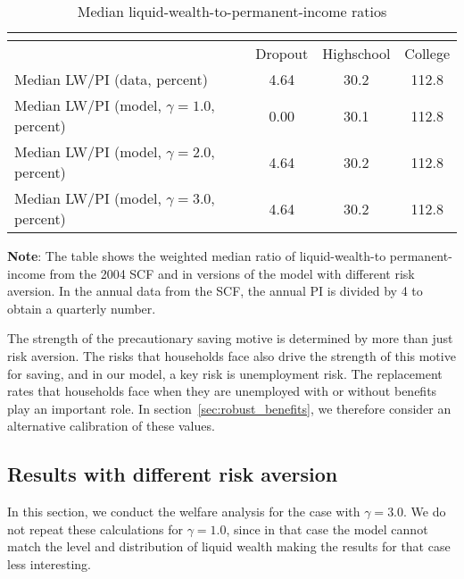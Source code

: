 \documentclass[\PathToRoot/\ProjectName]{subfiles}
\begin{document}
\begin{table}[th]
  \begin{center}
    \begin{tabular}{lccc}
      \multicolumn{4}{l}{}                                                           \\ \midrule
                                                    & Dropout & Highschool & College \\ \midrule
      Median LW/PI (data, percent)                  & 4.64    & 30.2       & 112.8   \\
      Median LW/PI (model, $\gamma = 1.0$, percent) & 0.00    & 30.1       & 112.8   \\
      Median LW/PI (model, $\gamma = 2.0$, percent) & 4.64    & 30.2       & 112.8   \\
      Median LW/PI (model, $\gamma = 3.0$, percent) & 4.64    & 30.2       & 112.8   \\ \bottomrule
    \end{tabular}
    \caption{Median liquid-wealth-to-permanent-income ratios}
    \whenintegrated{\label{tab:robustness_gamma_mlwpi}} 
    \parbox{15cm}{\small \vspace{.05cm} \textbf{Note}: The table shows the weighted median ratio of liquid-wealth-to permanent-income from the 2004 SCF and in versions of the model with different risk aversion.
      In the annual data from the SCF, the annual PI is divided by 4 to obtain a quarterly number.\normalsize}
  \end{center}
\end{table}



The strength of the precautionary saving motive is determined by more than just risk aversion.
The risks that households face also drive the strength of this motive for saving, and in our model, a key risk is unemployment risk.
The replacement rates that households face when they are unemployed with or without benefits play an important role.
In section~\ref{sec:robust_benefits}, we therefore consider an alternative calibration of these values.

\subsection*{Results with different risk aversion}
\whenintegrated{\label{sec:robust_gamma_results}} 

In this section, we conduct the welfare analysis for the case with $\gamma=3.0$.
We do not repeat these calculations for $\gamma=1.0$, since in that case the model cannot match the level and distribution of liquid wealth making the results for that case less interesting.
\end{document}

